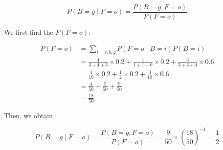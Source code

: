 \begin{solution}
    \[
        P(B = g \mid F = o)
        = \frac{P(B = g, F = o)}{P(F = o)}
    \]

    We first find the $P(F = o)$:

    \begin{align*}
        P(F = o)
        &= \sum_{i = r, b, g}{P(F = o \mid B = i)P(B = i)} \\
        &= \frac{4}{3 + 4 + 3} \times 0.2 + \frac{1}{1 + 1 + 0} \times 0.2 + \frac{3}{3 + 3 + 4} \times 0.6 \\
        &= \frac{4}{10} \times 0.2 + \frac{1}{2} \times 0.2 + \frac{3}{10} \times 0.6 \\
        &= \frac{4}{50} + \frac{5}{50} + \frac{9}{50} \\
        &= \frac{18}{50}
    \end{align*}

    Then, we obtain

    \[
        P(B = g \mid F = o) = \frac{P(B = g, F = o)}{P(F = o)} = \frac{9}{50} \times \left(\frac{18}{50}\right)^{-1} = \frac{1}{2}
    \]
\end{solution}
